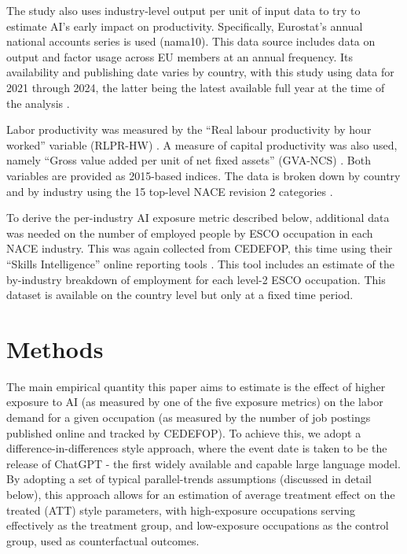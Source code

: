 \documentclass[11pt]{article}
\begin{document}
The study also uses industry-level output per unit of input data to try to estimate AI's early impact on productivity. Specifically, Eurostat's annual national accounts series is used (nama10). This data source includes data on output and factor usage across EU members at an annual frequency. Its availability and publishing date varies by country, with this study using data for 2021 through 2024, the latter being the latest available full year at the time of the analysis \cite{Eurostat_nama_10_prod_metadata}.

Labor productivity was measured by the ``Real labour productivity by hour worked'' variable (RLPR-HW) \cite{Eurostat_nama_10_lp_ulc}. A measure of capital productivity was also used, namely ``Gross value added per unit of net fixed assets'' (GVA-NCS) \cite{Eurostat_nama_10_cp_a21}. Both variables are provided as 2015-based indices. The data is broken down by country and by industry using the 15 top-level NACE revision 2 categories \cite{eurostat2008nace}.

To derive the per-industry AI exposure metric described below, additional data was needed on the number of employed people by ESCO occupation in each NACE industry. This was again collected from CEDEFOP, this time using their ``Skills Intelligence'' online reporting tools \cite{skills_intelligence_tool}. This tool includes an estimate of the by-industry breakdown of employment for each level-2 ESCO occupation. This dataset is available on the country level but only at a fixed time period.


\section{Methods}
\label{sec:methods}

The main empirical quantity this paper aims to estimate is the effect of higher exposure to AI (as measured by one of the five exposure metrics) on the labor demand for a given occupation (as measured by the number of job postings published online and tracked by CEDEFOP). To achieve this, we adopt a difference-in-differences style approach, where the event date is taken to be the release of ChatGPT - the first widely available and capable large language model. By adopting a set of typical parallel-trends assumptions (discussed in detail below), this approach allows for an estimation of average treatment effect on the treated (ATT) style parameters, with high-exposure occupations serving effectively as the treatment group, and low-exposure occupations as the control group, used as counterfactual outcomes.
\end{document}
